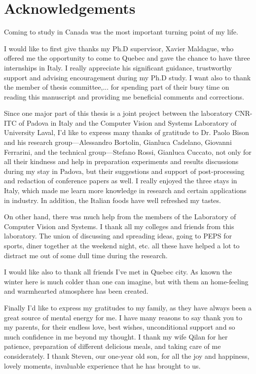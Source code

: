 \chapter*{Acknowledgements}         %

Coming to study in Canada was the most important turning point of my life.

I would like to first give thanks my Ph.D supervisor, Xavier Maldague, who offered me the opportunity to come to Quebec and gave the chance to have three internships in Italy. I really appreciate his significant guidance, trustworthy support and advising encouragement during my Ph.D study. I want also to thank the member of thesis committee,... for spending part of their busy time on reading this manuscript and providing me beneficial comments and corrections.


Since one major part of this thesis is a joint project between the laboratory CNR-ITC of Padova in Italy and the Computer Vision and Systems Laboratory of University Laval, I’d like to express many thanks of gratitude to Dr. Paolo Bison and his research group—Alessandro Bortolin, Gianluca Cadelano, Giovanni Ferrarini, and the technical group—Stefano Rossi, Gianluca Cuccato, not only for all their kindness and help in preparation experiments and results discussions during my stay in Padova, but their suggestions and support of post-processing and redaction of conference papers as well. I really enjoyed the three stays in Italy, which made me learn more knowledge in research and certain applications in industry. In addition, the Italian foods have well refreshed my tastes.

On other hand, there was much help from the members of the Laboratory of Computer Vision and Systems. I thank all my colleges and friends from this laboratory. The union of discussing and spreading ideas, going to PEPS for sports, diner together at the weekend night, etc. all these have helped a lot to distract me out of some dull time during the research.

I would like also to thank all friends I've met in Quebec city. As known the winter here is much colder than one can imagine, but with them an home-feeling and warmhearted atmosphere has been created. 

Finally I'd like to express my gratitudes to my family, as they have always been a great source of mental energy for me. I have many reasons to say thank you to my parents, for their endless love, best wishes, unconditional support and so much confidence in me beyond my thought. I thank my wife Qilan for her patience, preparation of different delicious meals, and taking care of me considerately. I thank Steven, our one-year old son, for all the joy and happiness, lovely moments, invaluable experience that he has brought to us. 
